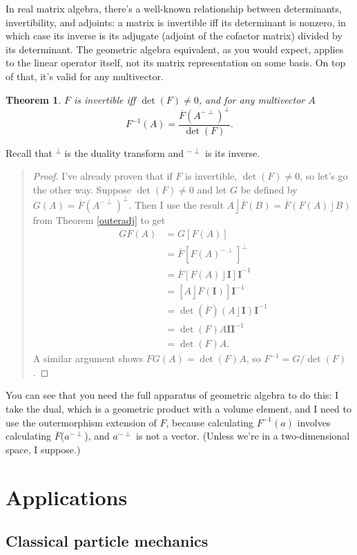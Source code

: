 \documentclass{utarticle}
\newcommand{\bl}[1]{\ensuremath{\bm{#1}}}
\newcommand{\I}{\bl{I}}
\DeclareMathOperator{\lin}{\rfloor}
\newcommand{\dual}[1]{\ensuremath{#1^\perp}}
\newcommand{\invdual}[1]{\ensuremath{#1^{-\perp}}}
\newcommand{\adj}[1]{\ensuremath{\overline{#1}}}
\newtheorem{thm}{Theorem}
\newcommand{\bp}{\begin{quotation} \begin{proof}}
\newcommand{\ep}{\end{proof} \end{quotation}}
\begin{document}
In real matrix algebra, there's a well-known relationship between determinants, invertibility, and adjoints:
a matrix is invertible iff its determinant is nonzero, in which case its inverse is its adjugate (adjoint of
the cofactor matrix) divided by its determinant.  The geometric algebra equivalent, as you would expect,
applies to the linear operator itself, not its matrix representation on some basis.  On top of that, it's valid 
for any multivector. 
\begin{thm}
$F$ is invertible iff $\det(F) \neq 0$, and for any multivector $A$
\begin{equation} F^{-1}(A) = \frac{\dual{\adj{F}(\invdual{A})}}{\det(F)}. \end{equation}
\end{thm}
Recall that \dual{} is the duality transform and \invdual{} is its inverse.
\bp
I've already proven that if $F$ is invertible, $\det(F) \neq 0$, so let's go the other way.  Suppose
$\det(F) \neq 0$ and let $G$ be defined by $G(A) = \dual{\adj{F}(\invdual{A})}$.  Then I use the
result $A \lin \adj{F}(B) = \adj{F}(F(A) \lin B)$ from Theorem \ref{outeradj} to get
\begin{align}
GF(A) & = G[F(A)] \nonumber \\
            & = \dual{\adj{F}[\invdual{F(A)}]} \nonumber \\
            & = \adj{F}[F(A) \lin \I] \I^{-1} \nonumber \\
            & = [A \lin \adj{F}(\I)] \I^{-1} \nonumber \\
            & = \det(\adj{F})  (A \lin \I) \I^{-1} \nonumber \\
            & = \det(F) A \I \I^{-1} \nonumber \\
            & = \det(F) A.
\end{align}
A similar argument shows $FG(A) = \det(F) A$, so $F^{-1} = G/\det(F)$.
\ep
You can see that you need the full apparatus of geometric algebra to do this: I take the dual, which is a 
geometric product with a volume element, and I need to use the outermorphism extension of $F$, 
because calculating $F^{-1}(a)$ involves calculating \adj{F}(\invdual{a}), and \invdual{a} is not 
a vector.  (Unless we're in a two-dimensional space, I suppose.)


\section{Applications}
\label{apps}

\subsection{Classical particle mechanics}
\label{classicalmech}
\end{document}
